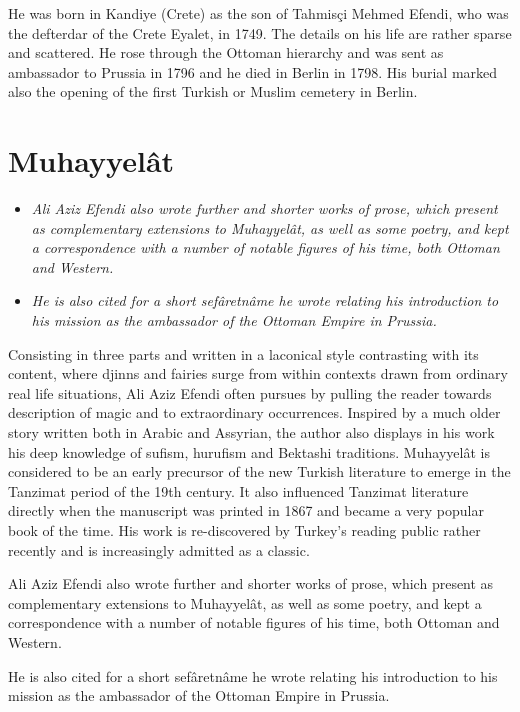 He was born in Kandiye (Crete) as the son of Tahmisçi Mehmed Efendi, who
was the defterdar of the Crete Eyalet, in 1749. The details on his life
are rather sparse and scattered. He rose through the Ottoman hierarchy
and was sent as ambassador to Prussia in 1796 and he died in Berlin in
1798. His burial marked also the opening of the first Turkish or Muslim
cemetery in Berlin.

\section{Muhayyelât}\label{muhayyeluxe2t}

\begin{itemize}
\item
  \emph{Ali Aziz Efendi also wrote further and shorter works of prose,
  which present as complementary extensions to Muhayyelât, as well as
  some poetry, and kept a correspondence with a number of notable
  figures of his time, both Ottoman and Western.}
\item
  \emph{He is also cited for a short sefâretnâme he wrote relating his
  introduction to his mission as the ambassador of the Ottoman Empire in
  Prussia.}
\end{itemize}

Consisting in three parts and written in a laconical style contrasting
with its content, where djinns and fairies surge from within contexts
drawn from ordinary real life situations, Ali Aziz Efendi often pursues
by pulling the reader towards description of magic and to extraordinary
occurrences. Inspired by a much older story written both in Arabic and
Assyrian, the author also displays in his work his deep knowledge of
sufism, hurufism and Bektashi traditions. Muhayyelât is considered to be
an early precursor of the new Turkish literature to emerge in the
Tanzimat period of the 19th century. It also influenced Tanzimat
literature directly when the manuscript was printed in 1867 and became a
very popular book of the time. His work is re-discovered by Turkey's
reading public rather recently and is increasingly admitted as a
classic.

Ali Aziz Efendi also wrote further and shorter works of prose, which
present as complementary extensions to Muhayyelât, as well as some
poetry, and kept a correspondence with a number of notable figures of
his time, both Ottoman and Western.

He is also cited for a short sefâretnâme he wrote relating his
introduction to his mission as the ambassador of the Ottoman Empire in
Prussia.

